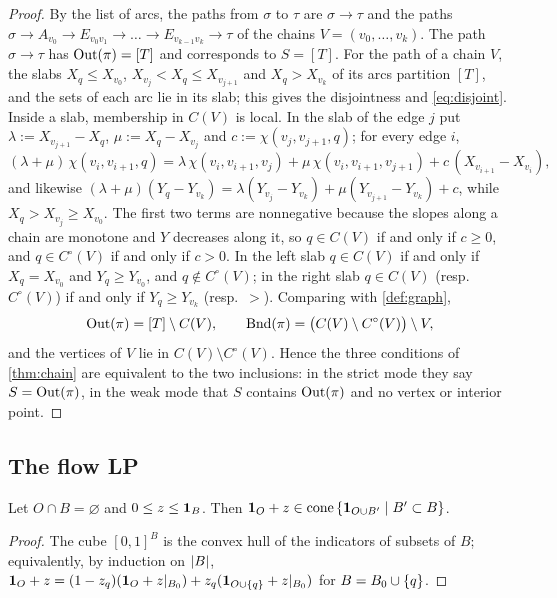 \begin{proof}
By the list of arcs, the paths from $\sigma$ to $\tau$ are $\sigma\to\tau$ and the paths $\sigma\to A_{v_0}\to E_{v_0v_1}\to\dots\to E_{v_{k-1}v_k}\to\tau$ of the chains $V=(v_0,\dots,v_k)$. The path $\sigma\to\tau$ has $\operatorname{Out}(\pi)=[T]$ and corresponds to $S=[T]$. For the path of a chain $V$, the slabs $X_q\le X_{v_0}$, $X_{v_j}<X_q\le X_{v_{j+1}}$ and $X_q>X_{v_k}$ of its arcs partition $[T]$, and the sets of each arc lie in its slab; this gives the disjointness and \eqref{eq:disjoint}. Inside a slab, membership in $C(V)$ is local. In the slab of the edge $j$ put $\lambda:=X_{v_{j+1}}-X_q$, $\mu:=X_q-X_{v_j}$ and $c:=\chi(v_j,v_{j+1},q)$; for every edge $i$,
\[
(\lambda+\mu)\,\chi(v_i,v_{i+1},q)=\lambda\,\chi(v_i,v_{i+1},v_j)+\mu\,\chi(v_i,v_{i+1},v_{j+1})+c\,(X_{v_{i+1}}-X_{v_i}),
\]
and likewise $(\lambda+\mu)(Y_q-Y_{v_k})=\lambda(Y_{v_j}-Y_{v_k})+\mu(Y_{v_{j+1}}-Y_{v_k})+c$, while $X_q>X_{v_j}\ge X_{v_0}$. The first two terms are nonnegative because the slopes along a chain are monotone and $Y$ decreases along it, so $q\in C(V)$ if and only if $c\ge0$, and $q\in C^\circ(V)$ if and only if $c>0$. In the left slab $q\in C(V)$ if and only if $X_q=X_{v_0}$ and $Y_q\ge Y_{v_0}$, and $q\notin C^\circ(V)$; in the right slab $q\in C(V)$ (resp.\ $C^\circ(V)$) if and only if $Y_q\ge Y_{v_k}$ (resp.\ $>$). Comparing with \cref{def:graph},
\[
\operatorname{Out}(\pi)=[T]\setminus C(V),\qquad \operatorname{Bnd}(\pi)=\bigl(C(V)\setminus C^\circ(V)\bigr)\setminus V,
\]
and the vertices of $V$ lie in $C(V)\setminus C^\circ(V)$. Hence the three conditions of \cref{thm:chain} are equivalent to the two inclusions: in the strict mode they say $S=\operatorname{Out}(\pi)$, in the weak mode that $S$ contains $\operatorname{Out}(\pi)$ and no vertex or interior point.
\end{proof}

\subsection{The flow LP}

\begin{lemma}[cube]\label{lem:cube}
Let $O\cap B=\varnothing$ and $0\le z\le\mathbf 1_{B}$. Then $\mathbf 1_{O}+z\in\operatorname{cone}\left\{ \mathbf 1_{O\cup B'}\mid B'\subset B \right\}$.
\end{lemma}

\begin{proof}
The cube $[0,1]^B$ is the convex hull of the indicators of subsets of $B$; equivalently, by induction on $\left\lvert B \right\rvert$, $\mathbf 1_{O}+z=(1-z_q)(\mathbf 1_{O}+z|_{B_0})+z_q(\mathbf 1_{O\cup\left\{ q \right\}}+z|_{B_0})$ for $B=B_0\cup\left\{ q \right\}$.
\end{proof}

